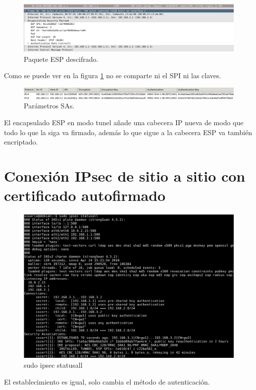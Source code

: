 \documentclass[11pt]{article}
\begin{document}
    \begin{figure}[H]
      \centering
      \includegraphics[width = \textwidth]{espdcipher}
      \caption{Paquete ESP descifrado.}
    \end{figure}

    \par
    Como se puede ver en la figura \ref{fig:espcfg} no se comparte ni el SPI ni
    las claves.

    \begin{figure}[H]
      \centering
      \includegraphics[width = \textwidth]{espcfg}
      \caption{Parámetros SAs.}
      \label{fig:espcfg}
    \end{figure}

    \par
    El encapsulado ESP en modo tunel añade una cabecera IP nueva de modo que
    todo lo que la siga va firmado, además lo que sigue a la cabecera ESP
    va también encriptado.

  \section{Conexión IPsec de sitio a sitio con certificado autofirmado}
    \begin{figure}[H]
      \centering
      \hspace*{-.5in}
      \includegraphics[width = 1.2\textwidth]{statusall}
      \caption{sudo ipsec statusall}
    \end{figure}

    \par
    El establecimiento es igual, solo cambia el método de autenticación.
\end{document}
